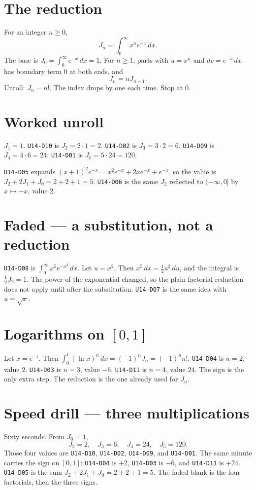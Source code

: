 \section{The reduction}
For an integer $n\ge 0$,
\[
J_n=\int_0^{\infty}x^n e^{-x}\,dx.
\]
The base is $J_0=\int_0^{\infty}e^{-x}\,dx=1$. For $n\ge 1$, parts with $u=x^n$ and $dv=e^{-x}\,dx$ has boundary term 0 at both ends, and
\[
J_n=n J_{n-1}.
\]
Unroll: $J_n=n!$. The index drops by one each time. Stop at 0.

\section{Worked unroll}
$J_1=1$. \texttt{U14-D10} is $J_2=2\cdot 1=2$. \texttt{U14-D02} is $J_3=3\cdot 2=6$. \texttt{U14-D09} is $J_4=4\cdot 6=24$. \texttt{U14-D01} is $J_5=5\cdot 24=120$.

\texttt{U14-D05} expands $(x+1)^2 e^{-x}=x^2 e^{-x}+2x e^{-x}+e^{-x}$, so the value is $J_2+2J_1+J_0=2+2+1=5$. \texttt{U14-D06} is the same $J_2$ reflected to $(-\infty,0]$ by $x\mapsto -x$, value 2.

\section{Faded --- a substitution, not a reduction}
\texttt{U14-D08} is $\int_0^{\infty}x^5 e^{-x^2}\,dx$. Let $u=x^2$. Then $x^5\,dx=\frac12 u^2\,du$, and the integral is $\frac12 J_2=1$. The power of the exponential changed, so the plain factorial reduction does not apply until after the substitution. \texttt{U14-D07} is the same idea with $u=\sqrt x$.

\section{Logarithms on $[0,1]$}
Let $x=e^{-t}$. Then $\int_0^1(\ln x)^n\,dx=(-1)^n J_n=(-1)^n n!$.
\texttt{U14-D04} is $n=2$, value $2$. \texttt{U14-D03} is $n=3$, value $-6$. \texttt{U14-D11} is $n=4$, value $24$. The sign is the only extra step. The reduction is the one already used for $J_n$.

\section{Speed drill --- three multiplications}
Sixty seconds. From $J_0=1$,
\[
J_2=2,\quad J_3=6,\quad J_4=24,\quad J_5=120.
\]
Those four values are \texttt{U14-D10}, \texttt{U14-D02}, \texttt{U14-D09}, and \texttt{U14-D01}. The same minute carries the sign on $[0,1]$: \texttt{U14-D04} is $+2$, \texttt{U14-D03} is $-6$, and \texttt{U14-D11} is $+24$. \texttt{U14-D05} is the sum $J_2+2J_1+J_0=2+2+1=5$. The faded blank is the four factorials, then the three signs.

